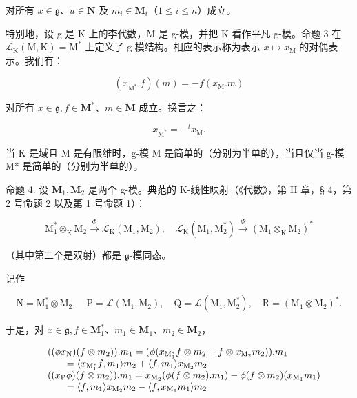 对所有 \(x \in \mathfrak{g}\)、\(u \in \mathbf{N}\) 及 \(m_i \in \mathbf{M}_i\)（\(1 \leqslant i \leqslant n\)）成立。

特别地，设 g 是 K 上的李代数，M 是 g-模，并把 K 看作平凡 g-模。命题 3 在 \(\mathcal{L}_{\mathrm{K}}(\mathrm{M},\mathrm{K}) = \mathrm{M}^{*}\) 上定义了 g-模结构。相应的表示称为表示 \(x\mapsto x_{\mathrm{M}}\) 的对偶表示。我们有：

\[
(x _ {\mathrm{M} ^ {*}}. f) (m) = - f (x _ {\mathrm{M}}. m)\tag{8}
\]

对所有 \(x \in \mathfrak{g}, f \in \mathbf{M}^*\)、\(m \in \mathbf{M}\) 成立。换言之：

\[
x _ {\mathrm{M} ^ {*}} = - ^ {t} x _ {\mathrm{M}}.\tag{9}
\]

当 K 是域且 M 是有限维时，g-模 M 是简单的（分别为半单的），当且仅当 g-模 M* 是简单的（分别为半单的）。

命题 4. 设 \(\mathbf{M}_1, \mathbf{M}_2\) 是两个 g-模。典范的 K-线性映射（《代数》，第 II 章，§ 4，第 2 号命题 2 以及第 1 号命题 1）：

\[
\mathrm{M} _ {1} ^ {*} \otimes_ {\mathrm{K}} \mathrm{M} _ {2} \xrightarrow {\Phi} \mathscr {L} _ {\mathrm{K}} (\mathrm{M} _ {1}, \mathrm{M} _ {2}), \quad \mathscr {L} _ {\mathrm{K}} (\mathrm{M} _ {1}, \mathrm{M} _ {2} ^ {*}) \xrightarrow {\Psi} (\mathrm{M} _ {1} \otimes_ {\mathrm{K}} \mathrm{M} _ {2}) ^ {*}
\]

（其中第二个是双射）都是 \(\mathfrak{g}\)-模同态。

  记作

\[
\mathrm{N} = \mathrm{M} _ {1} ^ {*} \otimes \mathrm{M} _ {2}, \quad \mathrm{P} = \mathscr {L} (\mathrm{M} _ {1}, \mathrm{M} _ {2}), \quad \mathrm{Q} = \mathscr {L} (\mathrm{M} _ {1}, \mathrm{M} _ {2} ^ {*}), \quad \mathrm{R} = (\mathrm{M} _ {1} \otimes \mathrm{M} _ {2}) ^ {*}.
\]

于是，对 \(x \in \mathfrak{g}, f \in \mathbf{M}_1^*\)、\(m_1 \in \mathbf{M}_1\)、\(m_2 \in \mathbf{M}_2\)，

\[
\begin{array}{r l} & {((\phi x _ {\mathrm{N}}) (f \otimes m _ {2})). m _ {1} = (\phi (x _ {\mathrm{M} _ {1} ^ {*}} f \otimes m _ {2} + f \otimes x _ {\mathrm{M} _ {2}} m _ {2})). m _ {1}} \\ & {\qquad = \langle x _ {\mathrm{M} _ {1} ^ {*}} f, m _ {1} \rangle m _ {2} + \langle f, m _ {1} \rangle x _ {\mathrm{M} _ {2}} m _ {2}} \\ & {((x _ {\mathrm{P}} \phi) (f \otimes m _ {2})). m _ {1} = x _ {\mathrm{M} _ {2}} (\phi (f \otimes m _ {2}). m _ {1}) - \phi (f \otimes m _ {2}) (x _ {\mathrm{M} _ {1}} m _ {1})} \\ & {\qquad = \langle f, m _ {1} \rangle x _ {\mathrm{M} _ {2}} m _ {2} - \langle f, x _ {\mathrm{M} _ {1}} m _ {1} \rangle m _ {2}} \end{array}
\]

